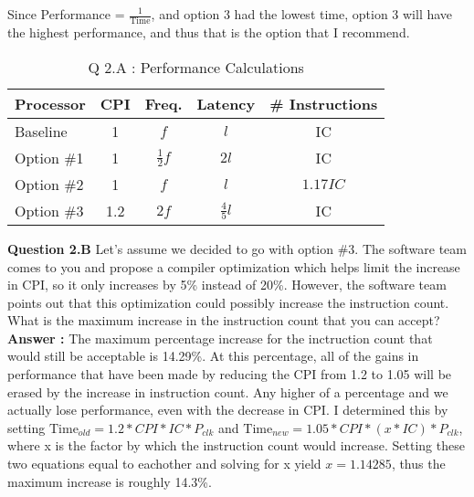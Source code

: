 \documentclass[a4paper,11pt]{article}
\newcommand{\answer}{\textbf{Answer : }}
\begin{document}
Since Performance = $\frac{1}{\text{Time}}$, and option 3 had the lowest time, option 3 will have the highest performance, and thus that is the option that I recommend. 

\begin{table}[H]
\caption{Q 2.A : Performance Calculations} \label{tab:q2acalc} 
\begin{center}
\begin{tabular}{| l | c | c | c | c |} \hline
Processor  & CPI &    Freq.       & Latency        & \# Instructions \\ \hline
Baseline   &  1  &    $f$         & $l$            &       IC        \\ \hline
Option \#1 &  1  & $\frac{1}{2}f$ & $2l$           &       IC        \\ \hline  
Option \#2 &  1  &    $f$         & $l$            &       $1.17IC$  \\ \hline 
Option \#3 & 1.2 &    $2f$        & $\frac{4}{5}l$ &       IC        \\ \hline       
\end{tabular}
\end{center}
\end{table}


\item \textbf{Question 2.B} Let’s assume we decided to go with option \#3. The software team comes to you and propose a compiler optimization which helps limit the increase in CPI, so it only increases by 5\% instead of 20\%. However, the software team points out that this optimization could possibly increase the instruction count. What is the maximum increase in the instruction count that you can accept?\\

        \answer The maximum percentage increase for the inctruction count that would still be acceptable is 14.29\%. At this percentage, all of the gains in performance that have been made by reducing the CPI from 1.2 to 1.05 will be erased by the increase in instruction count. Any higher of a percentage and we actually lose performance, even with the decrease in CPI. I determined this by setting $\text{Time}_{old} = 1.2*CPI*IC*P_{clk}$ and $\text{Time}_{new} = 1.05*CPI*(x*IC)*P_{clk}$, where x is the factor by which the instruction count would increase. Setting these two equations equal to eachother and solving for x yield $x = 1.14285$, thus the maximum increase is roughly 14.3\%.\\
\end{document}
